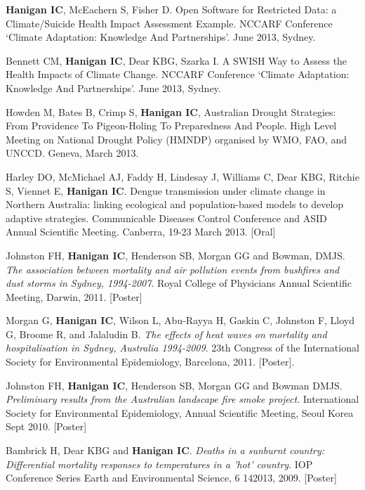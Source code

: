 \documentclass[a4paper,11pt]{article}
\begin{document}
\begin{revnumerate}
\item \textbf{Hanigan IC}, McEachern S, Fisher D. Open Software for Restricted Data: a Climate/Suicide Health Impact Assessment Example. NCCARF Conference ‘Climate Adaptation: Knowledge And Partnerships’. June 2013, Sydney.

\item Bennett CM, \textbf{Hanigan IC}, Dear KBG, Szarka I. A SWISH Way to Assess the Health Impacts of Climate Change. NCCARF Conference ‘Climate Adaptation: Knowledge And Partnerships’. June 2013, Sydney.

\item Howden M, Bates B, Crimp S, \textbf{Hanigan IC}, Australian Drought Strategies: From Providence To Pigeon-Holing To Preparedness And People. High Level Meeting on National Drought Policy (HMNDP) organised by WMO, FAO, and UNCCD. Geneva, March 2013. 

\item Harley DO, McMichael AJ, Faddy H, Lindesay J, Williams C, Dear KBG, Ritchie S, Viennet E, \textbf{Hanigan IC}. Dengue transmission under climate change in Northern Australia: linking ecological and population-based models to develop adaptive strategies. Communicable Diseases Control Conference and ASID Annual Scientific Meeting. Canberra, 19-23 March 2013.  [Oral]

\item Johnston FH, \textbf{Hanigan IC}, Henderson SB, Morgan GG and Bowman, DMJS. \emph{The association between mortality and air pollution events from bushfires and dust storms in Sydney, 1994-2007}. Royal College of Physicians Annual Scientific Meeting, Darwin,  2011. [Poster]

\item Morgan G, \textbf{Hanigan IC}, Wilson L, Abu-Rayya H, Gaskin C, Johnston F, Lloyd G, Broome R, and Jalaludin B. \emph{The effects of heat waves on mortality and hospitalisation in Sydney, Australia 1994-2009}. 23th Congress of the International Society for Environmental Epidemiology, Barcelona, 2011. [Poster].

\item Johnston FH, \textbf{Hanigan IC}, Henderson SB, Morgan GG and Bowman DMJS. \emph{Preliminary results from the Australian landscape fire smoke project}. International Society for Environmental Epidemiology, Annual Scientific Meeting, Seoul Korea Sept 2010. [Poster]

\item Bambrick H, Dear KBG and \textbf{Hanigan IC}.  \emph{Deaths in a sunburnt country: Differential mortality responses to temperatures in a 'hot' country}. IOP Conference Series Earth and Environmental Science, 6 142013, 2009. [Poster]


\end{revnumerate}
\end{document}
